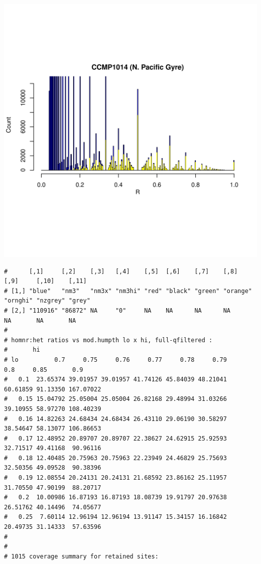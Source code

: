 \documentclass{article}\usepackage[]{graphicx}\usepackage[]{color}
\makeatletter
\def\maxwidth{ %
  \ifdim\Gin@nat@width>\linewidth
    \linewidth
  \else
    \Gin@nat@width
  \fi
}
\newenvironment{kframe}{%
 \def\at@end@of@kframe{}%
 \ifinner\ifhmode%
  \def\at@end@of@kframe{\end{minipage}}%
  \begin{minipage}{\columnwidth}%
 \fi\fi%
 \def\FrameCommand##1{\hskip\@totalleftmargin \hskip-\fboxsep
 \colorbox{shadecolor}{##1}\hskip-\fboxsep
     \hskip-\linewidth \hskip-\@totalleftmargin \hskip\columnwidth}%
 \MakeFramed {\advance\hsize-\width
   \@totalleftmargin\z@ \linewidth\hsize
   \@setminipage}}%
 {\par\unskip\endMakeFramed%
 \at@end@of@kframe}
\newenvironment{knitrout}{}{} %
\makeatother
\begin{document}
\begin{knitrout}
\includegraphics[width=\maxwidth]{FigS7-hwe-histo-figs-knitr/unnamed-chunk-10-35} 
\begin{kframe}\begin{verbatim}
#      [,1]     [,2]    [,3]   [,4]    [,5]  [,6]    [,7]    [,8]     [,9]     [,10]    [,11] 
# [1,] "blue"   "nm3"   "nm3x" "nm3hi" "red" "black" "green" "orange" "ornghi" "nzgrey" "grey"
# [2,] "110916" "86872" NA     "0"     NA    NA      NA      NA       NA       NA       NA
# 
# homnr:het ratios vs mod.humpth lo x hi, full-qfiltered :
#       hi
# lo          0.7     0.75     0.76     0.77     0.78     0.79      0.8     0.85       0.9
#   0.1  23.65374 39.01957 39.01957 41.74126 45.84039 48.21041 60.61859 91.13350 167.07022
#   0.15 15.04792 25.05004 25.05004 26.82168 29.48994 31.03266 39.10955 58.97270 108.40239
#   0.16 14.82263 24.68434 24.68434 26.43110 29.06190 30.58297 38.54647 58.13077 106.86653
#   0.17 12.48952 20.89707 20.89707 22.38627 24.62915 25.92593 32.71517 49.41168  90.96116
#   0.18 12.40485 20.75963 20.75963 22.23949 24.46829 25.75693 32.50356 49.09528  90.38396
#   0.19 12.08554 20.24131 20.24131 21.68592 23.86162 25.11957 31.70550 47.90199  88.20717
#   0.2  10.00986 16.87193 16.87193 18.08739 19.91797 20.97638 26.51762 40.14496  74.05677
#   0.25  7.60114 12.96194 12.96194 13.91147 15.34157 16.16842 20.49735 31.14333  57.63596
# 
# 
# 1015 coverage summary for retained sites:

\end{verbatim}
\end{kframe}
\end{knitrout}
\end{document}

